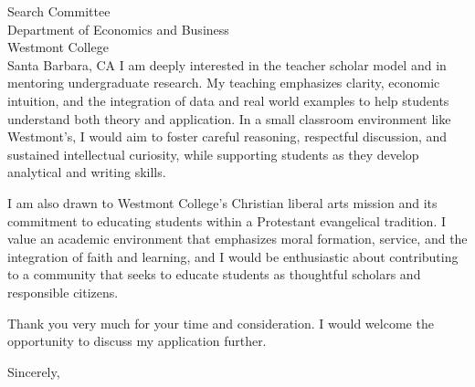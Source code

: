 \documentclass[11pt,letterpaper]{letter}
\begin{document}
\begin{letter}{
Search Committee \\
Department of Economics and Business \\
Westmont College \\
Santa Barbara, CA
}
I am deeply interested in the teacher scholar model and in mentoring undergraduate research. My teaching emphasizes clarity, economic intuition, and the integration of data and real world examples to help students understand both theory and application. In a small classroom environment like Westmont’s, I would aim to foster careful reasoning, respectful discussion, and sustained intellectual curiosity, while supporting students as they develop analytical and writing skills.

I am also drawn to Westmont College’s Christian liberal arts mission and its commitment to educating students within a Protestant evangelical tradition. I value an academic environment that emphasizes moral formation, service, and the integration of faith and learning, and I would be enthusiastic about contributing to a community that seeks to educate students as thoughtful scholars and responsible citizens.

Thank you very much for your time and consideration. I would welcome the opportunity to discuss my application further.

\closing{Sincerely,}

\end{letter}
\end{document}
